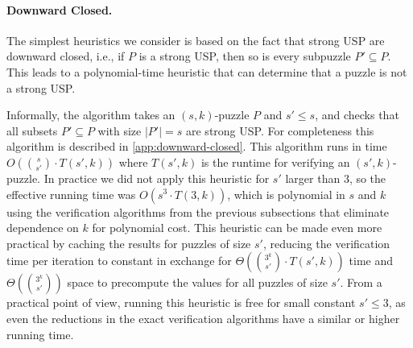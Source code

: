 \documentclass[11pt]{article}
\newcommand\sse{\subseteq}
\begin{document}
\vspace{-2ex}
\paragraph{Downward Closed.}
The simplest heuristics we consider is based on the fact that
strong USP are downward closed, i.e., if $P$ is a strong USP, then
so is every subpuzzle $P' \sse P$.  This leads to a polynomial-time heuristic
that can determine that a puzzle is not a strong USP.

Informally, the algorithm takes an $(s,k)$-puzzle $P$ and $s' \le
s$, and checks that all subsets $P' \subseteq P$ with size $|P'| = s$
are strong USP.  For completeness this algorithm is described in
\autoref{app:downward-closed}.  This algorithm runs in time $O(\binom{s}{s'}\cdot
T(s', k))$ where $T(s',k)$ is the runtime for
verifying an $(s',k)$-puzzle.  In practice we did not apply this
heuristic for $s'$ larger than $3$, so the effective running time was
$O(s^3 \cdot T(3,k))$, which is polynomial in $s$ and $k$ using the
verification algorithms from the previous subsections that eliminate
dependence on $k$ for polynomial cost.  This heuristic can be made
even more practical by caching the results for puzzles of size $s'$,
reducing the verification time per iteration to constant in exchange
for $\Theta(\binom{3^k}{s'}\cdot T(s',k))$ time and $\Theta(\binom{3^k}{s'})$ space to precompute the values for all
puzzles of size $s'$.
From a practical point of view, running this heuristic
is free for small constant $s' \le 3$, as even the reductions in the exact verification algorithms
have a similar or higher running time.
\end{document}
